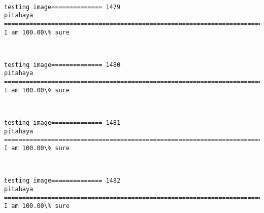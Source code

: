 \documentclass[11pt]{article}
\begin{document}
    \begin{center}
    \end{center}
    { \hspace*{\fill} \\}
    
    \begin{Verbatim}[commandchars=\\\{\}]
testing image============== 1479
pitahaya
============================================================================
I am 100.00\% sure

    \end{Verbatim}

    \begin{center}
    \end{center}
    { \hspace*{\fill} \\}
    
    \begin{Verbatim}[commandchars=\\\{\}]
testing image============== 1480
pitahaya
============================================================================
I am 100.00\% sure

    \end{Verbatim}

    \begin{center}
    \end{center}
    { \hspace*{\fill} \\}
    
    \begin{Verbatim}[commandchars=\\\{\}]
testing image============== 1481
pitahaya
============================================================================
I am 100.00\% sure

    \end{Verbatim}

    \begin{center}
    \end{center}
    { \hspace*{\fill} \\}
    
    \begin{Verbatim}[commandchars=\\\{\}]
testing image============== 1482
pitahaya
============================================================================
I am 100.00\% sure

    \end{Verbatim}
\end{document}
